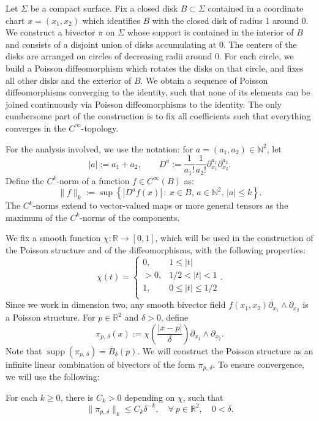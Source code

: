 \documentclass[AHL,Unicode,published]{cedram}
\newcommand{\R}{\mathbb{R}}
\newcommand{\N}{\mathbb{N}}
\newcommand{\norm}[1]{\|#1\|}
\DeclareMathOperator{\supp}{supp}
\let\oldforall\forall
\renewcommand*{\forall}{\mathrel{\oldforall}}
\begin{document}
Let $\Sigma$ be a compact surface. Fix a closed disk $B\subset \Sigma$ contained in a coordinate chart $x=(x_1,x_2)$ which identifies $B$ with the closed disk of radius 1 around 0. We construct a bivector $\pi$ on $\Sigma$ whose support is contained in the interior of $B$ and consists of a disjoint union of disks accumulating at $0$. The centers of the disks are arranged on circles of decreasing radii around $0$. For each circle, we build a Poisson diffeomorphism which rotates the disks on that circle, and fixes all other disks and the exterior of $B$. We obtain a sequence of Poisson diffeomorphisms converging to the identity, such that none of its elements can be joined continuously via Poisson diffeomorphisms to the identity. The only cumbersome part of the construction is to fix all coefficients such that everything converges in the $C^{\infty}$-topology.

For the analysis involved, we use the notation: for $a=(a_1,a_2)\in \N^2$, let
\[
|a|:=a_1+a_2, \qquad D^a:=\frac{1}{a_1!}\frac{1}{a_2!}\partial_{x_1}^{a_1}\partial_{x_2}^{a_2}.
\]
Define the $C^k$-norm of a function $f\in C^{\infty}(B)$ as:
\[
\norm{f}_k:=\sup\left\{\left|D^a f(x)\right|\, : \ x\in B, \, a\in \N^2, \, |a|\leq k\right\}.
\]
The $C^k$-norms extend to vector-valued maps or more general tensors as the maximum of the $C^k$-norms of the components.

We fix a smooth function $\chi:\R\to [0,1]$, which will be used in the construction of the Poisson structure and of the diffeomorphisms, with the following properties:
\[
\chi(t)=
\begin{cases} 0, & 1\leq |t| \\
>0, & 1/2 < |t|<1\\
1, & 0 \leq |t|\leq 1/2\\
\end{cases}.
\]
Since we work in dimension two, any smooth bivector field $f(x_1,x_2)\partial_{x_1}\wedge \partial_{x_2}$ is a Poisson structure. For $p\in \R^2$ and $\delta>0$, define
\[
\pi_{p,\,\delta}(x):=\chi\left(\frac{|x-p|}{\delta}\right)\partial_{x_1}\wedge\partial_{x_2}.
\]
Note that $\supp(\pi_{p,\,\delta})=\overline{B}_\delta(p)$. We will construct the Poisson structure as an infinite linear combination of bivectors of the form $\pi_{p,\,\delta}$. To ensure convergence, we will use the following:

\begin{lemm}\label{lemma_bivector}
For each $k\geq 0$, there is $C_k>0$ depending on $\chi$, such that
\[
\norm{\pi_{p,\,\delta}}_{k}\leq C_k \delta^{-k}, \quad \forall \ p\in \R^2,\quad 0<\delta.
\]
\end{lemm}
\end{document}
